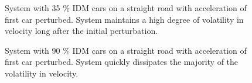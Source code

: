 \documentclass[12pt]{article}
\begin{document}
\begin{figure}[H]
  \centering
  \caption{System with 35 \% IDM cars on a straight road with acceleration of first car perturbed. System maintains a high degree of volatility in velocity long after the initial perturbation.}
\end{figure}

\begin{figure}[H]
  \centering
  \caption{System with 90 \% IDM cars on a straight road with acceleration of first car perturbed. System quickly dissipates the majority of the volatility in velocity.}
\end{figure}
\end{document}
